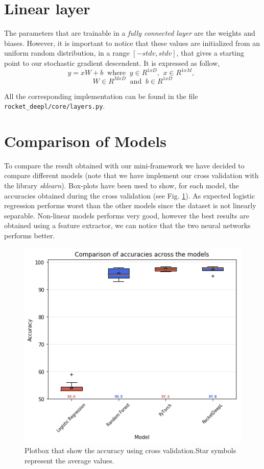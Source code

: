 \documentclass[journal, a4paper]{IEEEtran}
\begin{document}
\section{Linear layer}
\label{sec:linearl}
The parameters that are trainable in a  \textit{fully connected layer} are the weights and biases. However, it is important to notice that these values are initialized from an uniform random distribution, in a range $[-stdv, stdv]$, that gives a starting point to our stochastic gradient descendent. It is expressed as follow,
$$ y = xW + b\;\;\mbox{where}\;\;y\in R^{1xD}\mbox{,} \;\; x \in R^{1xM}\mbox{,}\;\;$$$$ W\in R^{MxD}\;\;\mbox{and}\;\;b \in R^{1xD} $$

All the corresponding implementation can be found in the file \texttt{rocket\_deepl/core/layers.py}.

\section{Comparison of Models}
To compare the result obtained with our mini-framework we have decided to compare different models (note that we have implement our cross validation with the library \textit{sklearn}).
Box-plots have been used to show, for each model, the accuracies obtained during the cross validation (see Fig. \ref{fig:plotbox}).
As expected logistic regression performs worst than the other models since the dataset is not linearly separable. Non-linear models performs very good, however the best results are obtained using a feature extractor, we can notice that the two neural networks performs better. 

\begin{figure}
    \centering
    \includegraphics[width=0.99\linewidth]{accuraciesproj2.png}
    \caption{Plotbox that show the accuracy using cross validation.Star symbols represent the average values.}
    \label{fig:plotbox}
\end{figure}
\end{document}
